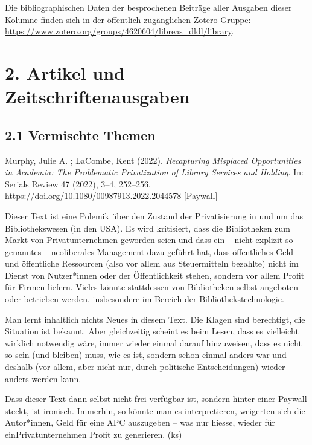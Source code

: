 \documentclass[a4paper,
fontsize=11pt,
oneside,
numbers=noperiodatend,
parskip=half-,
bibliography=totoc,
final
]{scrartcl}
\begin{document}
Die bibliographischen Daten der besprochenen Beiträge aller Ausgaben
dieser Kolumne finden sich in der öffentlich zugänglichen Zotero-Gruppe:
\url{https://www.zotero.org/groups/4620604/libreas_dldl/library}.

\hypertarget{artikel-und-zeitschriftenausgaben}{%
\section{2. Artikel und
Zeitschriftenausgaben}\label{artikel-und-zeitschriftenausgaben}}

\hypertarget{vermischte-themen}{%
\subsection{2.1 Vermischte Themen}\label{vermischte-themen}}

Murphy, Julie A. ; LaCombe, Kent (2022). \emph{Recapturing Misplaced
Opportunities in Academia: The Problematic Privatization of Library
Services and Holding}. In: Serials Review 47 (2022), 3--4, 252--256,
\url{https://doi.org/10.1080/00987913.2022.2044578} {[}Paywall{]}

Dieser Text ist eine Polemik über den Zustand der Privatisierung in und
um das Bibliothekswesen (in den USA). Es wird kritisiert, dass die
Bibliotheken zum Markt von Privatunternehmen geworden seien und dass ein
-- nicht explizit so genanntes -- neoliberales Management dazu geführt
hat, dass öffentliches Geld und öffentliche Ressourcen (also vor allem
aus Steuermitteln bezahlte) nicht im Dienst von Nutzer*innen oder der
Öffentlichkeit stehen, sondern vor allem Profit für Firmen liefern.
Vieles könnte stattdessen von Bibliotheken selbst angeboten oder
betrieben werden, insbesondere im Bereich der Bibliothekstechnologie.

Man lernt inhaltlich nichts Neues in diesem Text. Die Klagen sind
berechtigt, die Situation ist bekannt. Aber gleichzeitig scheint es beim
Lesen, dass es vielleicht wirklich notwendig wäre, immer wieder einmal
darauf hinzuweisen, dass es nicht so sein (und bleiben) muss, wie es
ist, sondern schon einmal anders war und deshalb (vor allem, aber nicht
nur, durch politische Entscheidungen) wieder anders werden kann.

Dass dieser Text dann selbst nicht frei verfügbar ist, sondern hinter
einer Paywall steckt, ist ironisch. Immerhin, so könnte man es
interpretieren, weigerten sich die Autor*innen, Geld für eine APC
auszugeben -- was nur hiesse, wieder für einPrivatunternehmen Profit zu
generieren. (ks)
\end{document}
